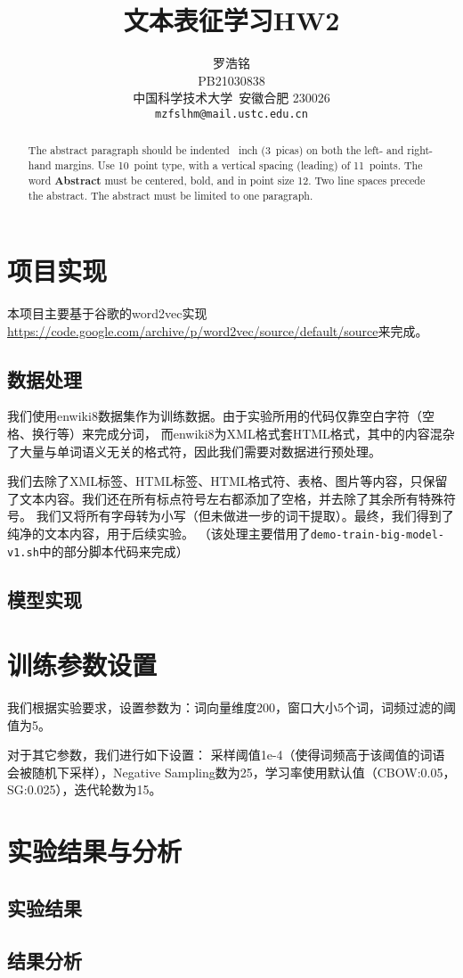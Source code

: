 \documentclass{article}
\title{文本表征学习HW2}
\author{
  罗浩铭 \\
  PB21030838\\
  中国科学技术大学\ 安徽合肥 230026 \\
  \texttt{mzfslhm@mail.ustc.edu.cn} \\
}
\begin{document}
\maketitle


\begin{abstract}
  The abstract paragraph should be indented ~inch (3~picas) on
  both the left- and right-hand margins. Use 10~point type, with a vertical
  spacing (leading) of 11~points.  The word \textbf{Abstract} must be centered,
  bold, and in point size 12. Two line spaces precede the abstract. The abstract
  must be limited to one paragraph.
\end{abstract}

\section{项目实现}

本项目主要基于谷歌的word2vec实现\url{https://code.google.com/archive/p/word2vec/source/default/source}来完成。

\subsection{数据处理}

我们使用enwiki8数据集作为训练数据。由于实验所用的代码仅靠空白字符（空格、换行等）来完成分词，
而enwiki8为XML格式套HTML格式，其中的内容混杂了大量与单词语义无关的格式符，因此我们需要对数据进行预处理。

我们去除了XML标签、HTML标签、HTML格式符、表格、图片等内容，只保留了文本内容。我们还在所有标点符号左右都添加了空格，并去除了其余所有特殊符号。
我们又将所有字母转为小写（但未做进一步的词干提取）。最终，我们得到了纯净的文本内容，用于后续实验。
（该处理主要借用了\texttt{demo-train-big-model-v1.sh}中的部分脚本代码来完成）


\subsection{模型实现}


\section{训练参数设置}
我们根据实验要求，设置参数为：词向量维度200，窗口大小5个词，词频过滤的阈值为5。

对于其它参数，我们进行如下设置：
采样阈值1e-4（使得词频高于该阈值的词语会被随机下采样），Negative Sampling数为25，学习率使用默认值（CBOW:0.05，SG:0.025），迭代轮数为15。





\section{实验结果与分析}

\subsection{实验结果}

\subsection{结果分析}
\end{document}
